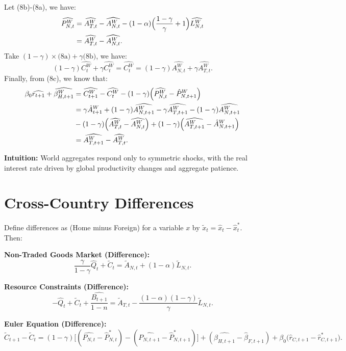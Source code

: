 \documentclass[a4paper,12pt]{article} %
\theoremstyle{nonitalic}
\begin{document}
Let (8b)-(8a), we have:
\begin{align*}
     \widehat{P_{N,t}^W} &=  \widehat{A_{T,t}^W} -  \widehat{A_{N,t}^W} - (1-\alpha)\Bigl(\frac{1-\gamma}{\gamma} + 1\Bigr)  \widehat{L_{N,t}^W} \\
    &=  \widehat{A_{T,t}^W} -  \widehat{A_{N,t}^W}.
\end{align*}
Take $(1-\gamma) \times \text{(8a)} + \gamma \text{(8b)}$, we have:
\[
(1-\gamma)  \widehat{C_t^W} + \gamma  \widehat{C_t^W} =  \widehat{C_t^W} = (1-\gamma)  \widehat{A_{N,t}^W} + \gamma  \widehat{A_{T,t}^W}.
\]
Finally, from (8c), we know that:
\begin{align*}
    \beta_0  \widehat{r_{t+1}} + \widehat{\beta_{H, t+1}^W} &=  \widehat{C_{t+1}^W} -  \widehat{C_t^W} - (1-\gamma)\Bigl( \widehat{P_{N,t}^W} - \hat{P}_{N, t+1}^W\Bigr) \\
    &= \gamma \hat{A}_{t+1}^W + (1-\gamma)  \widehat{A_{N,t+1}^W} - \gamma  \widehat{A_{T,t+1}^W} - (1-\gamma)  \widehat{A_{N,t+1}^W} \\
    \quad \quad &- (1-\gamma)\Bigl( \widehat{A_{T,t}^W} -  \widehat{A_{N,t}^W}\Bigr) + (1-\gamma) \Bigl( \widehat{A_{T,t+1}^W} - \hat{A}_{N, t+1}^W \Bigr) \\
    &= \widehat{A_{T, t+1}^W} -  \widehat{A_{T,t}^W}.
\end{align*}

\textbf{Intuition:} World aggregates respond only to symmetric shocks, with the real interest rate driven by global productivity changes and aggregate patience.

\section{Cross-Country Differences}

Define differences as (Home minus Foreign) for a variable $ x $ by $ \tilde{x}_t = \hat{x}_t - \hat{x}^*_t $. Then:

\textbf{Non-Traded Goods Market (Difference):}
\[
\frac{\gamma}{1-\gamma} \hat{Q}_t + \tilde{C}_t = \tilde{A}_{N,t} + (1-\alpha) \tilde{L}_{N,t}. \tag{9a}
\]

\textbf{Resource Constraints (Difference):}
\[
- \hat{Q}_t + \tilde{C}_t + \frac{\widehat{B_{t+1}}}{1-n} = \tilde{A}_{T,t} - \frac{(1-\alpha)(1-\gamma)}{\gamma} \tilde{L}_{N,t}. \tag{9b}
\]

\textbf{Euler Equation (Difference):}
\[
\tilde{C}_{t+1}-\tilde{C}_t = (1-\gamma)\Big[( \widehat{P_{N,t}}-\hat{P}^*_{N,t}) - ( \widehat{P_{N,t+1}}-\hat{P}^*_{N,t+1})\Big] + (\widehat{\beta_{H,t+1}}-\hat{\beta}_{F,t+1}) + \beta_0\Big(\hat{r}_{C,t+1}-\hat{r}^*_{C,t+1}\Big). \tag{9c}
\]
\end{document}
